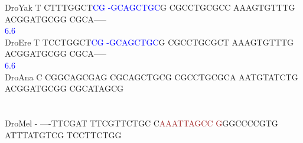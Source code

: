 \documentclass[11pt,twoside,reqno,a4paper]{article}
\begin{document}
{DroYak	T	CTTTGGCT\textcolor{Blue}{C}\textcolor{Blue}{G}	\textcolor{Blue}{-}\textcolor{Blue}{G}\textcolor{Blue}{C}\textcolor{Blue}{A}\textcolor{Blue}{G}\textcolor{Blue}{C}\textcolor{Blue}{T}\textcolor{Blue}{G}\textcolor{Blue}{C}G	CGCCTGCGCC	AAAGTGTTTG	ACGGATGCGG	CGCA-----\\
\hspace*{7\charwidth}\hspace*{1\charwidth}\hspace*{9\charwidth}\textcolor{Blue}{6.6}\hspace*{1\charwidth}\hspace*{1\charwidth}\hspace*{1\charwidth}\hspace*{1\charwidth}\hspace*{1\charwidth}\\
DroEre	T	TCCTGGCT\textcolor{Blue}{C}\textcolor{Blue}{G}	\textcolor{Blue}{-}\textcolor{Blue}{G}\textcolor{Blue}{C}\textcolor{Blue}{A}\textcolor{Blue}{G}\textcolor{Blue}{C}\textcolor{Blue}{T}\textcolor{Blue}{G}\textcolor{Blue}{C}G	CGCCTGCGCT	AAAGTGTTTG	ACGGATGCGG	CGCA-----\\
\hspace*{7\charwidth}\hspace*{1\charwidth}\hspace*{9\charwidth}\textcolor{Blue}{6.6}\hspace*{1\charwidth}\hspace*{1\charwidth}\hspace*{1\charwidth}\hspace*{1\charwidth}\hspace*{1\charwidth}\\
DroAna	C	CGGCAGCGAG	CGCAGCTGCG	CGCCTGCGCA	AATGTATCTG	ACGGATGCGG	CGCATAGCG\\
\hspace*{7\charwidth}\hspace*{1\charwidth}\hspace*{1\charwidth}\hspace*{1\charwidth}\hspace*{1\charwidth}\hspace*{1\charwidth}\hspace*{1\charwidth}\\
\\
DroMel	-	----TTCGAT	TTCGTTCTGC	C\textcolor{Brown}{A}\textcolor{Brown}{A}\textcolor{Brown}{A}\textcolor{Brown}{T}\textcolor{Brown}{T}\textcolor{Brown}{A}\textcolor{Brown}{G}\textcolor{Brown}{C}\textcolor{Brown}{C}	\textcolor{Brown}{G}GGCCCCGTG	ATTTATGTCG	TCCTTCTGG\\
}
\end{document}
